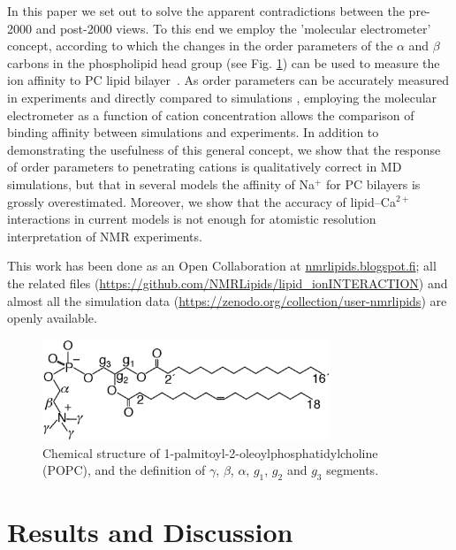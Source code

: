 \documentclass[twoside,twocolumn,9pt]{article}
\begin{document}
In this paper we set out to solve the apparent contradictions
between the pre-2000 and post-2000 views.
To this end we employ the 'molecular electrometer' concept,
according to which the changes in the order parameters of the $\alpha$ and $\beta$ carbons 
in the phospholipid head group (see Fig. \ref{POPCstructure}) can be used to measure the ion affinity to 
PC lipid bilayer~\cite{akutsu81,altenbach84,seelig87,scherer89}.
As order parameters can be accurately measured in experiments and directly compared to 
simulations \cite{ollila16}, employing the molecular electrometer as a function of cation concentration allows the 
comparison of binding affinity between simulations and experiments.
In addition to demonstrating the usefulness of this general concept,
we show that the response of order parameters to penetrating cations
is qualitatively correct in MD simulations, but that in several  models the affinity of Na$^{+}$ for PC bilayers
is grossly overestimated.
Moreover, we show that the accuracy of lipid--Ca$^{2+}$ interactions 
in current models is not enough for atomistic resolution interpretation of NMR experiments. 

This work has been done as an Open Collaboration at \url{nmrlipids.blogspot.fi};
all the related files (\url{https://github.com/NMRLipids/lipid_ionINTERACTION})
and almost all the simulation data (\url{https://zenodo.org/collection/user-nmrlipids})
are openly available.

\begin{figure}[]
  \centering
  \includegraphics[width=8.6cm]{../Fig/POPCstructure.eps}

  \caption{\label{POPCstructure}
    Chemical structure of 1-palmitoyl-2-oleoylphosphatidylcholine (POPC), and the definition of $\gamma$, $\beta$, $\alpha$, $g_1$, $g_2$ and $g_3$ segments.}
  
\end{figure}


\section{Results and Discussion}
\end{document}
